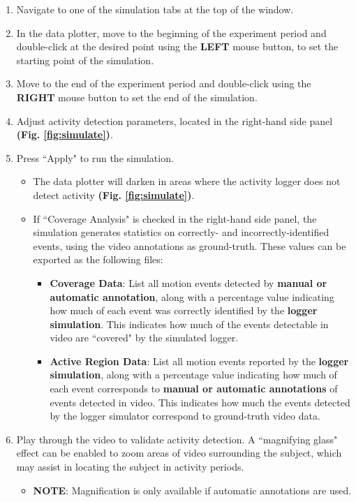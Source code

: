\documentclass[]{article}
\begin{document}
		\begin{enumerate}
			\item Navigate to one of the simulation tabs at the top of the window.
			\item In the data plotter, move to the beginning of the experiment period and double-click at the desired point using the \textbf{LEFT} mouse button, to set the starting point of the simulation.
			\item Move to the end of the experiment period and double-click using the \textbf{RIGHT} mouse button to set the end of the simulation. 
			\item Adjust activity detection parameters, located in the right-hand side panel \textbf{(Fig. \ref{fig:simulate})}.
			\item Press ``Apply" to run the simulation. 
				\begin{itemize}
					\item The data plotter will darken in areas where the activity logger does not detect activity \textbf{(Fig. \ref{fig:simulate})}.
					\item If ``Coverage Analysis" is checked in the right-hand side panel, the simulation generates statistics on correctly- and incorrectly-identified events, using the video annotations as ground-truth. These values can be exported as the following files:
					\begin{itemize}
						\item \textbf{Coverage Data}: List all motion events detected by \textbf{manual or automatic annotation}, along with a percentage value indicating how much of each event was correctly identified by the \textbf{logger simulation}. This indicates how much of the events detectable in video are ``covered" by the simulated logger.
						\item \textbf{Active Region Data}: List all motion events reported by the \textbf{logger simulation}, along with a percentage value indicating how much of each event corresponds to \textbf{manual or automatic annotations} of events detected in video. This indicates how much the events detected by the logger simulator correspond to ground-truth video data.
					\end{itemize} 
				\end{itemize}
			\item Play through the video to validate activity detection. A ``magnifying glass" effect can be enabled to zoom areas of video surrounding the subject, which may assist in locating the subject in activity periods. 
				\begin{itemize}
					\item \textbf{NOTE}: Magnification is only available if automatic annotations are used. 
				\end{itemize}
		\end{enumerate}
		
\end{document}
